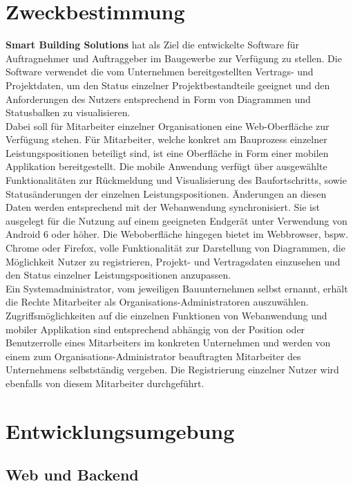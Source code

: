 {\section{Zweckbestimmung}\label{sec:zweckbestimmung}
\textbf{Smart Building Solutions} hat als Ziel die entwickelte Software f\"ur Auftragnehmer und Auftraggeber im Baugewerbe zur Verf\"ugung zu stellen.  Die Software verwendet die vom Unternehmen bereitgestellten Vertrags- und Projektdaten,  um den Status einzelner Projektbestandteile geeignet und den Anforderungen des Nutzers entsprechend in Form von Diagrammen und Statusbalken zu visualisieren. \\
Dabei soll f\"ur Mitarbeiter einzelner Organisationen eine Web-Oberfl\"ache zur Verf\"ugung stehen.  F\"ur  Mitarbeiter,  welche konkret am Bauprozess einzelner Leistungspositionen beteiligt sind,  ist eine Oberfl\"ache in Form einer mobilen Applikation bereitgestellt.  Die mobile Anwendung verf\"ugt  \"uber ausgew\"ahlte Funktionalit\"aten zur R\"uckmeldung und Visualisierung des Baufortschritts,  sowie Status\"anderungen der einzelnen Leistungspositionen.  \"Anderungen an diesen Daten werden entsprechend mit der Webanwendung synchronisiert.  Sie ist ausgelegt f\"ur die Nutzung auf einem geeigneten Endger\"at unter Verwendung von Android 6 oder h\"oher.  Die Weboberfl\"ache hingegen bietet im Webbrowser,  bspw. Chrome oder Firefox, volle Funktionalit\"at zur Darstellung von Diagrammen, die M\"oglichkeit Nutzer zu registrieren,  Projekt- und Vertragsdaten einzusehen und den Status einzelner Leistungspositionen anzupassen. \\
Ein Systemadministrator, vom jeweiligen Bauunternehmen selbst ernannt,  erh\"alt die Rechte  Mitarbeiter als Organisations-Administratoren auszuw\"ahlen.
Zugriffsm\"oglichkeiten auf die einzelnen Funktionen von Webanwendung und mobiler Applikation sind entsprechend abh\"angig von der Position oder Benutzerrolle eines Mitarbeiters im konkreten Unternehmen und werden von einem zum Organisations-Administrator beauftragten Mitarbeiter des Unternehmens selbstst\"andig vergeben.  Die Registrierung einzelner Nutzer wird ebenfalls von diesem Mitarbeiter durchgef\"uhrt.

\section{Entwicklungsumgebung}\label{sec:entwicklungsumgebung}

\subsection{Web und Backend}

}
